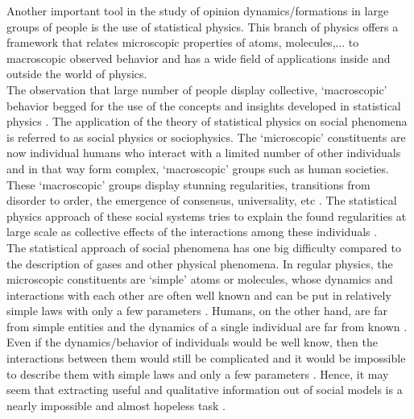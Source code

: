 \documentclass[11 pt , letterpaper , twoside , openright]{book}
\begin{document}
Another important tool in the study of opinion dynamics/formations in large groups of people is the use of statistical physics. This branch of physics offers a framework that relates microscopic properties of atoms, molecules,... to macroscopic observed behavior and has a wide field of applications inside and outside the world of physics.\\
The observation that large number of people display collective, `macroscopic' behavior begged for the use of the concepts and insights developed in statistical physics \cite{Sirbu2016}. The application of the theory of statistical physics on social phenomena is referred to as social physics or sociophysics. The `microscopic' constituents are now individual humans who interact with a limited number of other individuals and in that way form complex, `macroscopic' groups such as human societies. These `macroscopic' groups display stunning regularities, transitions from disorder to order, the emergence of consensus, universality, etc \cite{Buchanan2007}. The statistical physics approach of these social systems tries to explain the found regularities at large scale as collective effects of the interactions among these individuals \cite{Sirbu2016}.\\
\newline
The statistical approach of social phenomena has one big difficulty compared to the description of gases and other physical phenomena. In regular physics, the microscopic constituents are `simple' atoms or molecules, whose dynamics and interactions with each other are often well known and can be put in relatively simple laws with only a few parameters \cite{Castellano2009}. Humans, on the other hand, are far from simple entities and the dynamics of a single individual are far from known \cite{Castellano2009}. Even if the dynamics/behavior of individuals would be well know, then the interactions between them would still be complicated and it would be impossible to describe them with simple laws and only a few parameters \cite{Castellano2009}. Hence, it may seem that extracting useful and qualitative information out of social models is a nearly impossible and almost hopeless task \cite{Castellano2009}. \\
\end{document}

